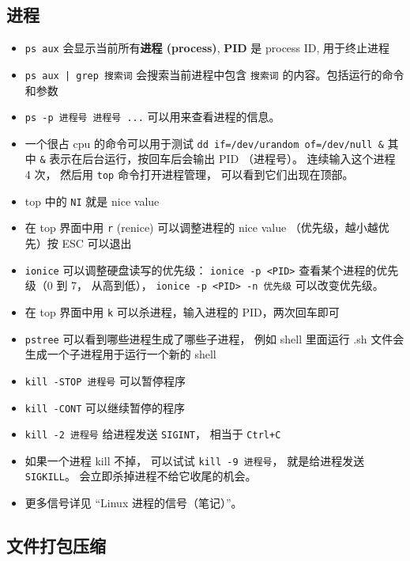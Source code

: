 \subsection{进程}
\begin{itemize}
\item \verb`ps aux` 会显示当前所有\textbf{进程 (process)}, \textbf{PID} 是 process ID, 用于终止进程
\item \verb`ps aux | grep 搜索词` 会搜索当前进程中包含 \verb`搜索词` 的内容。包括运行的命令和参数
\item \verb|ps -p 进程号 进程号 ...| 可以用来查看进程的信息。
\item 一个很占 cpu 的命令可以用于测试 \verb`dd if=/dev/urandom of=/dev/null &` 其中 \verb`&` 表示在后台运行，按回车后会输出 PID （进程号）。 连续输入这个进程 4 次， 然后用 \verb`top` 命令打开进程管理， 可以看到它们出现在顶部。
\item top 中的 \verb`NI` 就是 nice value
\item 在 top 界面中用 \verb`r` (renice) 可以调整进程的 nice value （优先级，越小越优先）按 ESC 可以退出
\item \verb|ionice| 可以调整硬盘读写的优先级： \verb|ionice -p <PID>| 查看某个进程的优先级（0 到 7， 从高到低）， \verb|ionice -p <PID> -n 优先级| 可以改变优先级。
\item 在 top 界面中用 \verb`k` 可以杀进程，输入进程的 PID，两次回车即可
\item \verb`pstree` 可以看到哪些进程生成了哪些子进程， 例如 shell 里面运行 .sh 文件会生成一个子进程用于运行一个新的 shell
\item \verb`kill -STOP 进程号` 可以暂停程序
\item \verb`kill -CONT` 可以继续暂停的程序
\item \verb|kill -2 进程号| 给进程发送 \verb|SIGINT|， 相当于 \verb|Ctrl+C|
\item 如果一个进程 kill 不掉， 可以试试 \verb|kill -9 进程号|， 就是给进程发送 \verb|SIGKILL|。 会立即杀掉进程不给它收尾的机会。
\item 更多信号详见 “Linux 进程的信号（笔记）”。
\end{itemize}

\subsection{文件打包压缩}
